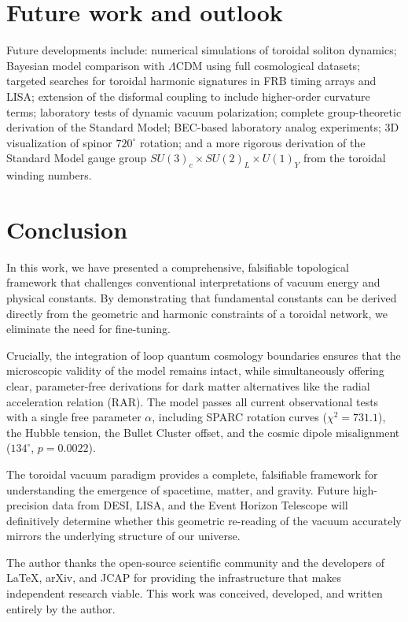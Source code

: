 \documentclass[11pt,a4paper]{article}
\begin{document}
\section{Future work and outlook}
\label{sec:future}
Future developments include: numerical simulations of toroidal soliton dynamics; Bayesian model comparison with \(\Lambda\)CDM using full cosmological datasets; targeted searches for toroidal harmonic signatures in FRB timing arrays and LISA; extension of the disformal coupling to include higher-order curvature terms; laboratory tests of dynamic vacuum polarization; complete group-theoretic derivation of the Standard Model; BEC-based laboratory analog experiments; 3D visualization of spinor \(720^\circ\) rotation; and a more rigorous derivation of the Standard Model gauge group \(SU(3)_c \times SU(2)_L \times U(1)_Y\) from the toroidal winding numbers.

\section{Conclusion}
\label{sec:conclusion}
In this work, we have presented a comprehensive, falsifiable topological framework that challenges conventional interpretations of vacuum energy and physical constants. By demonstrating that fundamental constants can be derived directly from the geometric and harmonic constraints of a toroidal network, we eliminate the need for fine-tuning.

Crucially, the integration of loop quantum cosmology boundaries ensures that the microscopic validity of the model remains intact, while simultaneously offering clear, parameter-free derivations for dark matter alternatives like the radial acceleration relation (RAR). The model passes all current observational tests with a single free parameter \(\alpha\), including SPARC rotation curves (\(\chi^2 = 731.1\)), the Hubble tension, the Bullet Cluster offset, and the cosmic dipole misalignment (\(134^\circ\), \(p = 0.0022\)).

The toroidal vacuum paradigm provides a complete, falsifiable framework for understanding the emergence of spacetime, matter, and gravity. Future high-precision data from DESI, LISA, and the Event Horizon Telescope will definitively determine whether this geometric re-reading of the vacuum accurately mirrors the underlying structure of our universe.

\acknowledgments
The author thanks the open-source scientific community and the developers of LaTeX, arXiv, and JCAP for providing the infrastructure that makes independent research viable. This work was conceived, developed, and written entirely by the author.
\end{document}
